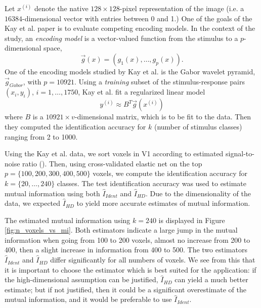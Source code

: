 Let $x^{(i)}$ denote the native $128 \times 128$-pixel representation
of the image (i.e. a $16384$-dimensional vector with entries between 0
and 1.)  One of the goals of the Kay et al. paper is to evaluate
competing encoding models.  In the context of the study,
an \emph{encoding model} is a vector-valued function from the stimulus
to a $p$-dimensional space,
\[
\vec{g}(x) = (g_1(x),\hdots, g_{p}(x)).
\]
One of the encoding models studied by Kay et al. is the Gabor wavelet pyramid,
$\vec{g}_{Gabor}$, with $p = 10921$.
Using a \emph{training} subset of the stimulus-response pairs $(x_i, y_i)$, $i = 1,\hdots, 1750$,
Kay et al. fit a regularized linear model
\[
y^{(i)} \approx B^T \vec{g}(x^{(i)})
\]
where $B$ is a $10921 \times v$-dimensional matrix, which is to be fit
to the data.  Then they computed the identification accuracy for $k$
(number of stimulus classes) ranging from 2 to 1000.

Using the Kay et al. data, we sort voxels in V1 according to estimated
signal-to-noise ratio (\cite{benjamini2013shuffle}).  Then, using
cross-validated elastic net on the top $p = \{100, 200, 300, 400,
500\}$ voxels, we compute the identification accuracy for $k =
\{20,\hdots, 240\}$ classes.  The test identification accuracy was
used to estimate mutual information using both $\hat{I}_{Ident}$ and
$\hat{I}_{HD}$.  Due to the dimensionality of the data, we expected
$\hat{I}_{HD}$ to yield more accurate estimates of mutual information.

The estimated mutual information using $k = 240$ is displayed in
Figure \ref{fig:n_voxels_vs_mi}.  Both estimators indicate a large
jump in the mutual information when going from 100 to 200 voxels,
almost no increase from 200 to 400, then a slight increase in
information from 400 to 500.  The two estimators $\hat{I}_{Ident}$ and
$\hat{I}_{HD}$ differ significantly for all numbers of voxels. We see
from this that it is important to choose the estimator which is best
suited for the application: if the high-dimensional assumption can be
justified, $\hat{I}_{HD}$ can yield a much better estimate; but if not
justified, then it could be a significant overestimate of the mutual
information, and it would be preferable to use $\hat{I}_{Ident}$.

